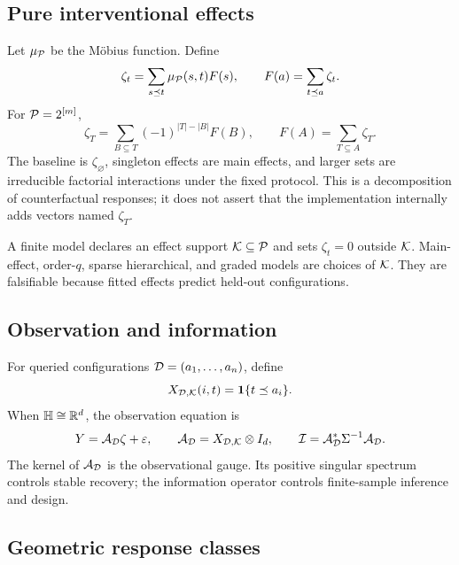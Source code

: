 \subsection{Pure interventional effects}

Let $\mu_{\mathcal P}$ be the M\"obius function.  Define
\begin{equation}
\zeta_t=\sum_{s\preceq t}\mu_{\mathcal P}(s,t)F(s),
\qquad
F(a)=\sum_{t\preceq a}\zeta_t.
\label{eq:mobius-response}
\end{equation}
For $\mathcal P=2^{[m]}$,
\[
\zeta_T=\sum_{B\subseteq T}(-1)^{|T|-|B|}F(B),
\qquad
F(A)=\sum_{T\subseteq A}\zeta_T.
\]
The baseline is $\zeta_\varnothing$, singleton effects are main effects, and larger sets are irreducible factorial interactions under the fixed protocol.  This is a decomposition of counterfactual responses; it does not assert that the implementation internally adds vectors named $\zeta_T$.

A finite model declares an effect support $\mathcal K\subseteq\mathcal P$ and sets $\zeta_t=0$ outside $\mathcal K$.  Main-effect, order-$q$, sparse hierarchical, and graded models are choices of $\mathcal K$.  They are falsifiable because fitted effects predict held-out configurations.

\subsection{Observation and information}

For queried configurations $\mathcal D=(a_1,\ldots,a_n)$, define
\[
X_{\mathcal D,\mathcal K}(i,t)=\mathbf 1\{t\preceq a_i\}.
\]
When $\mathbb H\cong\mathbb R^d$, the observation equation is
\begin{equation}
Y=\mathcal A_{\mathcal D}\zeta+\varepsilon,
\qquad
\mathcal A_{\mathcal D}=X_{\mathcal D,\mathcal K}\otimes I_d,
\qquad
\mathcal I=\mathcal A_{\mathcal D}^*\Sigma^{-1}\mathcal A_{\mathcal D}.
\label{eq:observation-information}
\end{equation}
The kernel of $\mathcal A_{\mathcal D}$ is the observational gauge.  Its positive singular spectrum controls stable recovery; the information operator controls finite-sample inference and design.

\subsection{Geometric response classes}


